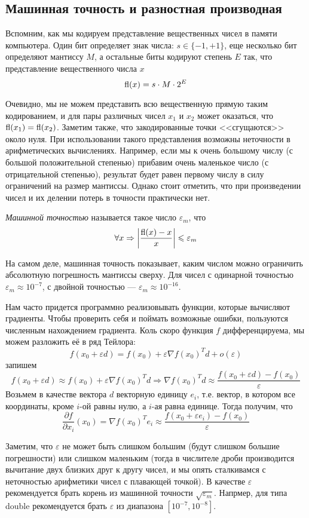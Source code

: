 \documentclass[a4paper, 12pt]{article}
\begin{document}
\subsection{Машинная точность и разностная производная}
Вспомним, как мы кодируем представление вещественных чисел в памяти компьютера. Один бит определяет знак числа: $s \in \{-1, +1\}$, еще несколько бит определяют мантиссу $M$, а остальные биты кодируют степень $E$ так, что представление вещественного числа $x$
$$\operatorname{\mathop{fl}}(x) = s\cdot M\cdot 2^E$$

Очевидно, мы не можем представить всю вещественную прямую таким кодированием, и для пары различных чисел $x_1$ и $x_2$ может оказаться, что $\operatorname{\mathop{fl}}(x_1) = \operatorname{\mathop{fl}}(x_2)$. Заметим также, что закодированные точки <<сгущаются>> около нуля. При использовании такого представления возможны неточности в арифметических вычислениях. Например, если мы к очень большому числу (с большой положительной степенью) прибавим очень маленькое число (с отрицательной степенью), результат будет равен первому числу в силу ограничений на размер мантиссы. Однако стоит отметить, что при произведении чисел и их делении потерь в точности практически нет.

\textit{Машинной точностью} называется такое число $\varepsilon_m$, что
$$\forall x \Rightarrow \left| \frac{\operatorname{\mathop{fl}}(x) - x}{x}\right| \leqslant \varepsilon_m$$

На самом деле, машинная точность показывает, каким числом можно ограничить абсолютную погрешность мантиссы сверху. Для чисел с одинарной точностью $\varepsilon_m \approx 10^{-7}$, с двойной точностью --- $\varepsilon_m \approx 10^{-16}$. 

Нам часто придется программно реализовывать функции, которые вычисляют градиенты. Чтобы проверить себя и поймать возможные ошибки, пользуются численным нахождением градиента. Коль скоро функция $f$ дифференцируема, мы можем разложить её в ряд Тейлора:
$$f(x_0 + \varepsilon d) = f(x_0) + \varepsilon \nabla f(x_0)^T d + o(\varepsilon)$$
запишем
$$f(x_0 + \varepsilon d) \approx f(x_0) + \varepsilon \nabla f(x_0)^T d \Rightarrow \nabla f(x_0)^T d \approx \frac{f(x_0 + \varepsilon d) - f(x_0)}{\varepsilon}$$
Возьмем в качестве вектора $d$ векторную единицу $e_i$, т.е. вектор, в котором все координаты, кроме $i$-ой равны нулю, а $i$-ая равна единице. Тогда получим, что 
$$\frac{\partial f}{\partial x_i}(x_0) = \nabla f(x_0)^T e_i \approx \frac{f(x_0 + \varepsilon e_i) - f(x_0)}{\varepsilon}$$

Заметим, что $\varepsilon$ не может быть слишком большим (будут слишком большие погрешности) или слишком маленьким (тогда в числителе дроби производится вычитание двух близких друг к другу чисел, и мы опять сталкивамся с неточностью арифметики чисел с плавающей точкой). В качестве $\varepsilon$ рекомендуется брать корень из машинной точности $\sqrt{\varepsilon_m}$. Напрмер, для типа \textsf{double} рекомендуется брать $\varepsilon$ из диапазона $[10^{-7}, 10^{-8}]$.
\end{document}
